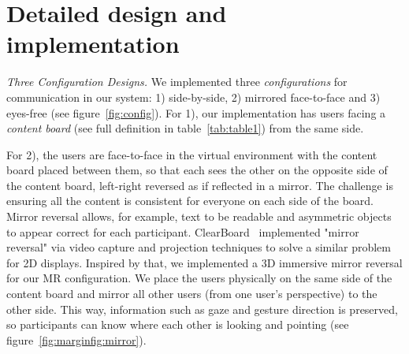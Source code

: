 \documentclass[sigchi-a]{acmart}
\begin{document}
\section{Detailed design and implementation}

\textit{Three Configuration Designs.}
We implemented three \textit{configurations} for communication in our system: 1) side-by-side, 2) mirrored face-to-face and 3) eyes-free (see figure~\ref{fig:config}).
For 1), our implementation has users facing a \textit{content board} (see full definition in table~\ref{tab:table1}) from the same side.



For 2), the users are face-to-face in the virtual environment with the content board placed between them, so that each sees the other on the opposite side of the content board, left-right reversed as if reflected in a mirror.
The challenge is ensuring all the content is consistent
for everyone on each side of the board. Mirror reversal allows, for example, text to be readable and asymmetric objects to appear correct for each participant.
ClearBoard~\cite{ishii1993integration} implemented "mirror reversal" via video capture and projection techniques to solve a similar problem for 2D displays. Inspired by that, we implemented a 3D immersive mirror reversal for our MR configuration. We place the users physically
on the same side of the content board and mirror all other users (from one user's perspective) to the other side.
This way, information such as gaze and gesture direction is preserved, so participants can know where each other is looking and pointing (see figure~\ref{fig:marginfig:mirror}).
\end{document}
